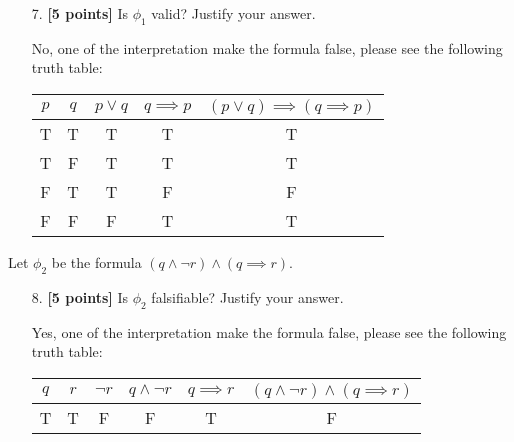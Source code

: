 \documentclass{article}
\begin{document}
\begin{enumerate}
\item[7.] \textbf{[5 points]} Is $\phi_1$ valid?  Justify your answer.
  
   \begin{answer}
    No, one of the interpretation make the formula false, please see the following truth table:\\
     \begin{tabular}{|c|c|c|c|c|} \hline
        $p$ & $q$ & $ p \lor q$ & $q \implies p$ & $(p \lor q) \implies (q \implies p)$ \\ \hline
        T & T & T & T & T \\ \hline
        T & F & T & T & T \\ \hline
        F & T & T & F & F \\ \hline
        F & F & F & T & T \\ \hline
    \end{tabular}
    \end{answer}
    
\end{enumerate}

\noindent
Let $\phi_2$ be the formula $(q \land \neg r) \land (q \implies r)$.

\begin{enumerate}
\item[8.] \textbf{[5 points]} Is $\phi_2$ falsifiable?  Justify your answer.
  
   \begin{answer}
    Yes, one of the interpretation make the formula false, please see the following truth table:\\
     \begin{tabular}{|c|c|c|c|c|c|} \hline
        $q$ & $r$ & $\neg r$ & $q \land \neg r$ & $q \implies r$ & $(q \land \neg r) \land (q \implies r)$\\ \hline
        T & T & F & F & T & F \\ \hline
    \end{tabular}
    \end{answer}
    
\end{enumerate}
\end{document}
